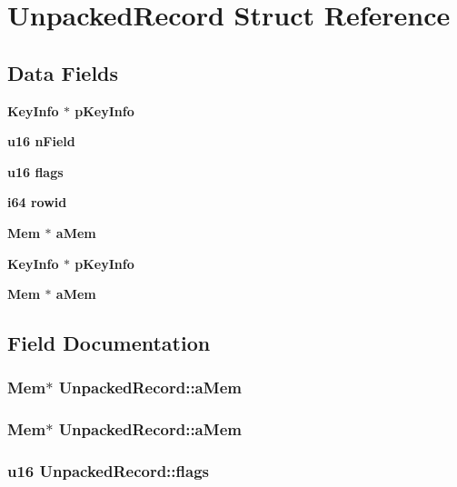 \section{Unpacked\-Record Struct Reference}
\label{structUnpackedRecord}
\subsection*{Data Fields}
\begin{CompactItemize}
\item 
\bf{Key\-Info} $\ast$ \bf{p\-Key\-Info}
\item 
\bf{u16} \bf{n\-Field}
\item 
\bf{u16} \bf{flags}
\item 
\bf{i64} \bf{rowid}
\item 
\bf{Mem} $\ast$ \bf{a\-Mem}
\item 
\bf{Key\-Info} $\ast$ \bf{p\-Key\-Info}
\item 
\bf{Mem} $\ast$ \bf{a\-Mem}
\end{CompactItemize}


\subsection{Field Documentation}
\subsubsection{\setlength{\rightskip}{0pt plus 5cm}\bf{Mem}$\ast$ \bf{Unpacked\-Record::a\-Mem}}\label{structUnpackedRecord_8e00ad1b15f0a668ab24e02c1edd88a4}


\subsubsection{\setlength{\rightskip}{0pt plus 5cm}\bf{Mem}$\ast$ \bf{Unpacked\-Record::a\-Mem}}\label{structUnpackedRecord_8e00ad1b15f0a668ab24e02c1edd88a4}


\subsubsection{\setlength{\rightskip}{0pt plus 5cm}\bf{u16} \bf{Unpacked\-Record::flags}}\label{structUnpackedRecord_7150f991b7d999d49d61e590e900951a}


